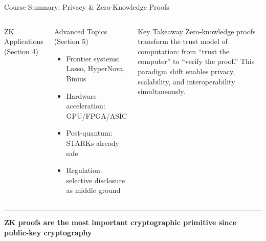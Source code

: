 \documentclass[8pt,aspectratio=169]{beamer}
\newcommand{\bottomnote}[1]{\vfill\vspace{-2mm}\textcolor{mllavender2}{\rule{\textwidth}{0.4pt}}\vspace{1mm}\footnotesize\textbf{#1}}
\begin{document}
\begin{frame}{Course Summary: Privacy \& Zero-Knowledge Proofs}
\begin{columns}[T]
\begin{block}{\footnotesize ZK Applications (Section 4)}
\end{block}
\vspace{0.1cm}
\begin{block}{\footnotesize Advanced Topics (Section 5)}
\footnotesize
\begin{itemize}
\item Frontier systems: Lasso, HyperNova, Binius
\item Hardware acceleration: GPU/FPGA/ASIC
\item Post-quantum: STARKs already safe
\item Regulation: selective disclosure as middle ground
\end{itemize}
\end{block}
\vspace{0.2cm}
\begin{exampleblock}{\footnotesize Key Takeaway}
\footnotesize
Zero-knowledge proofs transform the trust model of computation: from ``trust the computer'' to ``verify the proof.'' This paradigm shift enables privacy, scalability, and interoperability simultaneously.
\end{exampleblock}
\end{columns}
\bottomnote{ZK proofs are the most important cryptographic primitive since public-key cryptography}
\end{frame}
\end{document}
